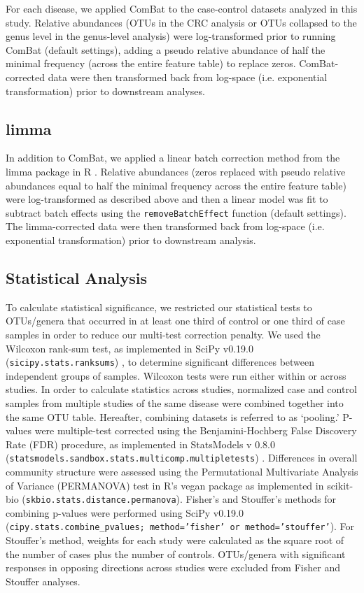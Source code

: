 For each disease, we applied ComBat \cite{8} to the case-control datasets analyzed in this study.
Relative abundances (OTUs in the CRC analysis or OTUs collapsed to the genus level in the genus-level analysis) were log-transformed prior to running ComBat (default settings), adding a pseudo relative abundance of half the minimal frequency (across the entire feature table) to replace zeros.
ComBat-corrected data were then transformed back from log-space (i.e. exponential transformation) prior to downstream analyses.

\subsection{limma}

In addition to ComBat, we applied a linear batch correction method from the limma package in R \cite{5}.
Relative abundances (zeros replaced with pseudo relative abundances equal to half the minimal frequency across the entire feature table) were log-transformed as described above and then a linear model was fit to subtract batch effects using the \texttt{removeBatchEffect} function (default settings).
The limma-corrected data were then transformed back from log-space (i.e. exponential transformation) prior to downstream analysis.

\subsection{Statistical Analysis}

To calculate statistical significance, we restricted our statistical tests to OTUs/genera that occurred in at least one third of control or one third of case samples in order to reduce our multi-test correction penalty.
We used the Wilcoxon rank-sum test, as implemented in SciPy v0.19.0 (\texttt{sicipy.stats.ranksums}) \cite{40}, to determine significant differences between independent groups of samples.
Wilcoxon tests were run either within or across studies.
In order to calculate statistics across studies, normalized case and control samples from multiple studies of the same disease were combined together into the same OTU table.
Hereafter, combining datasets is referred to as `pooling.'
P-values were multiple-test corrected using the Benjamini-Hochberg False Discovery Rate (FDR) procedure, as implemented in StatsModels v 0.8.0 (\texttt{statsmodels.sandbox.stats.multicomp.multipletests}) \cite{41}.
Differences in overall community structure were assessed using the Permutational Multivariate Analysis of Variance (PERMANOVA) test in R's vegan package \cite{42} as implemented in scikit-bio (\texttt{skbio.stats.distance.permanova}).
Fisher's and Stouffer's methods for combining p-values were performed using SciPy v0.19.0 (\texttt{cipy.stats.combine\_pvalues; method='fisher' or method='stouffer'}).
For Stouffer's method, weights for each study were calculated as the square root of the number of cases plus the number of controls.
OTUs/genera with significant responses in opposing directions across studies were excluded from Fisher and Stouffer analyses.

